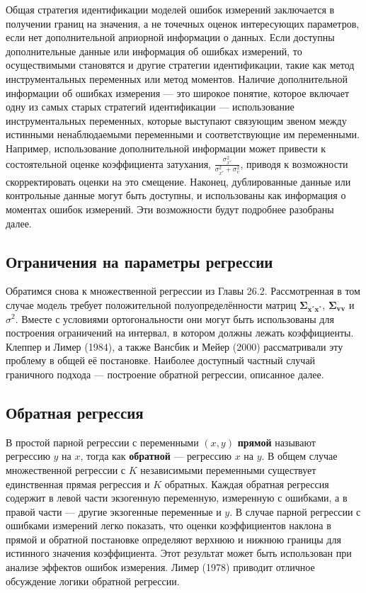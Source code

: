 Общая стратегия идентификации моделей ошибок измерений заключается в получении границ на значения, а не точечных оценок интересующих параметров, если нет дополнительной априорной информации о данных. Если доступны дополнительные данные или информация об ошибках измерений, то осуществимыми становятся и другие стратегии идентификации, такие как метод инструментальных переменных или метод моментов. 
Наличие дополнительной информации об ошибках измерения --- это широкое понятие, которое включает одну из самых старых стратегий идентификации --- использование инструментальных переменных, которые выступают связующим звеном между истинными ненаблюдаемыми переменными и соответствующие им переменными. Например, использование дополнительной информации может привести к состоятельной оценке коэффициента затухания, $\frac{\sigma^2_{x^*}}{\sigma^2_{x^*}+\sigma^2_{v}}$, приводя к возможности скорректировать оценки на это смещение. Наконец, дублированные данные или контрольные данные могут быть доступны, и использованы как информация о моментах ошибок измерений. Эти возможности будут подробнее разобраны далее.

\subsection{Ограничения на параметры регрессии}
 
Обратимся снова к множественной регрессии из Главы 26.2. Рассмотренная в том случае модель требует положительной полуопределённости матриц $\mathbf{\Sigma_{x^*x^*}}$, $\mathbf{\Sigma_{vv}}$ и $\sigma^2$. Вместе с условиями ортогональности они могут быть использованы для построения ограничений на интервал, в котором должны лежать коэффициенты. Клеппер и Лимер (1984), а также Вансбик и Мейер (2000) рассматривали эту проблему в общей её постановке. Наиболее доступный частный случай граничного  подхода –-- построение обратной регрессии, описанное далее.

\subsection*{Обратная регрессия} 

В простой парной регрессии с переменными $(x, y)$ {\bf прямой} называют регрессию $y$ на $x$, тогда как {\bf обратной} --– регрессию $x$ на $y$. В общем случае множественной регрессии с $K$ независимыми переменными существует единственная прямая регрессия и $K$ обратных. Каждая обратная регрессия содержит в левой части экзогенную переменную, измеренную с ошибками, а в правой части --- другие экзогенные переменные и $y$. В случае парной регрессии с ошибками измерений легко показать, что оценки коэффициентов наклона в прямой и обратной постановке определяют верхнюю и нижнюю границы для истинного значения коэффициента. Этот результат может быть использован при анализе эффектов ошибок измерения. Лимер (1978) приводит отличное обсуждение логики  обратной регрессии.
 
